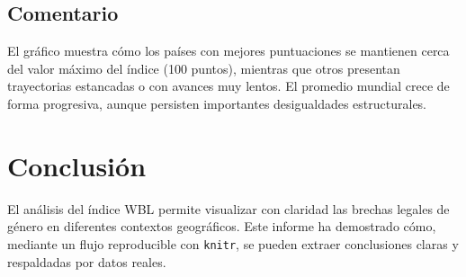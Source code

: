\documentclass[11pt]{article}\usepackage[]{graphicx}\usepackage[]{xcolor}
\begin{document}
\subsection{Comentario}

El gráfico muestra cómo los países con mejores puntuaciones se mantienen cerca del valor máximo del índice (100 puntos), mientras que otros presentan trayectorias estancadas o con avances muy lentos.  
El promedio mundial crece de forma progresiva, aunque persisten importantes desigualdades estructurales.

\section{Conclusión}

El análisis del índice WBL permite visualizar con claridad las brechas legales de género en diferentes contextos geográficos.  
Este informe ha demostrado cómo, mediante un flujo reproducible con \texttt{knitr}, se pueden extraer conclusiones claras y respaldadas por datos reales.
\end{document}
